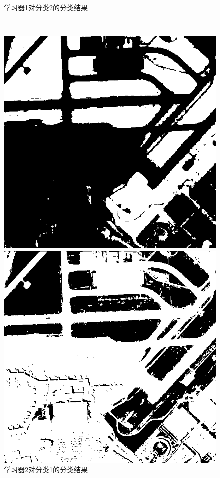 \begin{figure}[H]
\begin{minipage}{0.45\linewidth}
		\caption{学习器1对分类2的分类结果}
	\end{minipage} \\
	\begin{minipage}{0.45\linewidth}
		\includegraphics[width=\linewidth]{figure/airport_44_Classifier_2_Class_1.png}
		\caption{学习器2对分类1的分类结果}
	\end{minipage}
	\begin{minipage}{0.45\linewidth}
		\includegraphics[width=\linewidth]{figure/airport_44_Classifier_2_Class_2.png}

\end{minipage}
\end{figure}
